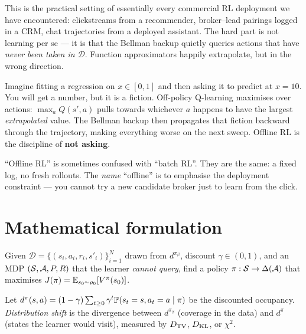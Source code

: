\documentclass[11pt,oneside]{scrbook}
\begin{document}
This is the practical setting of essentially every commercial RL deployment we have
encountered: clickstreams from a recommender, broker--lead pairings logged in a CRM,
chat trajectories from a deployed assistant. The hard part is not learning per se ---
it is that the Bellman backup quietly queries actions that have \emph{never been taken
in $\mathcal{D}$}. Function approximators happily extrapolate, but in the wrong direction.

\begin{intuition}
Imagine fitting a regression on $x \in [0, 1]$ and then asking it to predict at $x = 10$.
You will get a number, but it is a fiction. Off-policy Q-learning maximises over actions:
$\max_a Q(s', a)$ pulls towards whichever $a$ happens to have the largest \emph{extrapolated}
value. The Bellman backup then propagates that fiction backward through the trajectory,
making everything worse on the next sweep. Offline RL is the discipline of \textbf{not asking}.
\end{intuition}

\begin{pitfall}
``Offline RL'' is sometimes confused with ``batch RL''. They are the same: a fixed
log, no fresh rollouts. The \emph{name} ``offline'' is to emphasise the deployment
constraint --- you cannot try a new candidate broker just to learn from the click.
\end{pitfall}

\chapter{Mathematical formulation}

\begin{definition}
Given $\mathcal{D} = \{(s_i, a_i, r_i, s'_i)\}_{i=1}^N$ drawn from $d^{\pi_\beta}$,
discount $\gamma \in (0,1)$, and an MDP $(\mathcal{S},\mathcal{A},P,R)$ that the learner
\emph{cannot query}, find a policy $\pi: \mathcal{S} \to \Delta(\mathcal{A})$ that
maximises $J(\pi) = \mathbb{E}_{s_0 \sim \rho_0}[V^\pi(s_0)]$.
\end{definition}

\begin{definition}
Let $d^\pi(s,a) = (1-\gamma)\sum_{t \geq 0}\gamma^t \mathbb{P}(s_t=s, a_t=a \mid \pi)$ be the
discounted occupancy. \emph{Distribution shift} is the divergence between $d^{\pi_\beta}$
(coverage in the data) and $d^\pi$ (states the learner would visit), measured by
$D_{\mathrm{TV}}$, $D_{\mathrm{KL}}$, or $\chi^2$.
\end{definition}
\end{document}
